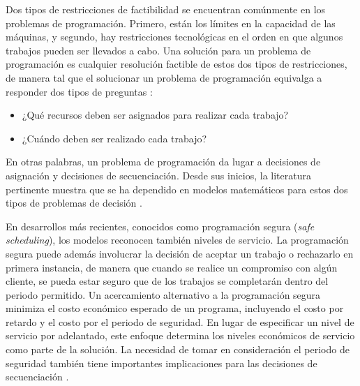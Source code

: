 \documentclass[spanish,draft,12pt,headsepline,footsepline,paper=letter]{scrreprt}
\begin{document}
Dos tipos de restricciones de factibilidad se encuentran comúnmente en los problemas de programación. Primero, están los límites en la capacidad de las máquinas, y segundo, hay restricciones tecnológicas en el orden en que algunos trabajos pueden ser llevados a cabo. Una solución para un problema de programación es cualquier resolución factible de estos dos tipos de restricciones, de manera tal que el solucionar un problema de programación equivalga a responder dos tipos de preguntas \citep[p.~4]{Baker2009}:

\begin{itemize}
\setlength{\itemsep}{0cm}%
\setlength{\parskip}{0cm}%
\item¿Qué recursos deben ser asignados para realizar cada trabajo?
\item¿Cuándo deben ser realizado cada trabajo?
\end{itemize}

En otras palabras, un problema de programación da lugar a decisiones de asignación y decisiones de secuenciación. Desde sus inicios, la literatura pertinente muestra que se ha dependido en modelos matemáticos para estos dos tipos de problemas de decisión \citep[p.~4,~5]{Baker2009}.

En desarrollos más recientes, conocidos como programación segura (\textit{safe scheduling}), los modelos reconocen también niveles de servicio. La programación segura puede además involucrar la decisión de aceptar un trabajo o rechazarlo en primera instancia, de manera que cuando se realice un compromiso con algún cliente, se pueda estar seguro que de los trabajos se completarán dentro del periodo permitido. Un acercamiento alternativo a la programación segura minimiza el costo económico esperado de un programa, incluyendo el costo por retardo y el costo por el periodo de seguridad. En lugar de especificar un nivel de servicio por adelantado, este enfoque determina los niveles económicos de servicio como parte de la solución. La necesidad de tomar en consideración el periodo de seguridad también tiene importantes implicaciones para las decisiones de secuenciación \citep[p.~5]{Baker2009}.
\end{document}
